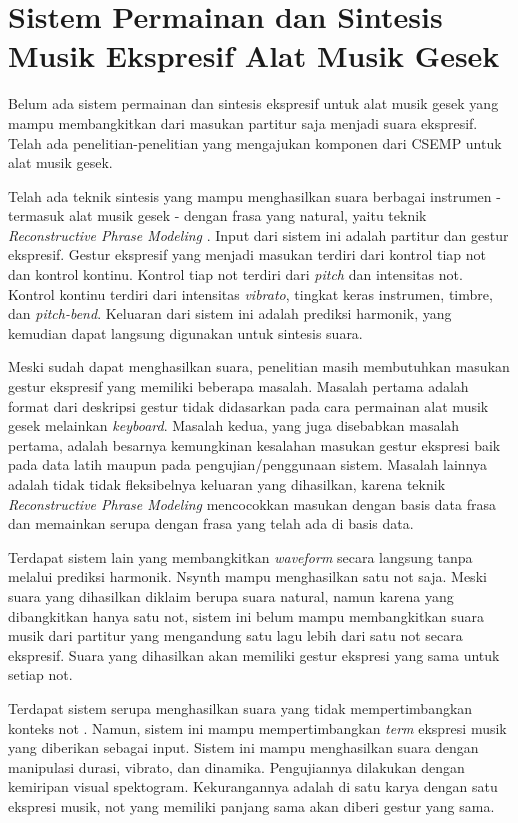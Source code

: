 \section{Sistem Permainan dan Sintesis Musik Ekspresif Alat Musik Gesek}

Belum ada sistem permainan dan sintesis ekspresif untuk alat musik gesek yang mampu membangkitkan dari masukan partitur saja menjadi suara ekspresif. Telah ada penelitian-penelitian yang mengajukan komponen dari CSEMP untuk alat musik gesek.

Telah ada teknik sintesis yang mampu menghasilkan suara berbagai instrumen - termasuk alat musik gesek - dengan frasa yang natural, yaitu teknik \textit{Reconstructive Phrase Modeling} \parencite{lindemann2007rpm}. Input dari sistem ini adalah partitur dan gestur ekspresif. Gestur ekspresif yang menjadi masukan terdiri dari kontrol tiap not dan kontrol kontinu. Kontrol tiap not terdiri dari \textit{pitch} dan intensitas not. Kontrol kontinu terdiri dari intensitas \textit{vibrato}, tingkat keras instrumen, timbre, dan \textit{pitch-bend}. Keluaran dari sistem ini adalah prediksi harmonik, yang kemudian dapat langsung digunakan untuk sintesis suara.

Meski sudah dapat menghasilkan suara, penelitian \citet{lindemann2007rpm} masih membutuhkan masukan gestur ekspresif yang memiliki beberapa  masalah. Masalah pertama adalah format dari deskripsi gestur tidak didasarkan pada cara permainan alat musik gesek melainkan \textit{keyboard}. Masalah kedua, yang juga disebabkan masalah pertama, adalah besarnya kemungkinan kesalahan masukan gestur ekspresi baik pada data latih maupun pada pengujian/penggunaan sistem. Masalah lainnya adalah tidak tidak fleksibelnya keluaran yang dihasilkan, karena teknik \textit{Reconstructive Phrase Modeling} mencocokkan masukan dengan basis data frasa dan memainkan serupa dengan frasa yang telah ada di basis data.

Terdapat sistem lain yang membangkitkan \textit{waveform} secara langsung tanpa melalui prediksi harmonik. Nsynth \parencite{nsynth2017} mampu menghasilkan satu not saja. Meski suara yang dihasilkan diklaim berupa suara natural, namun karena yang dibangkitkan hanya satu not, sistem ini belum mampu membangkitkan suara musik dari partitur yang mengandung satu lagu lebih dari satu not secara ekspresif. Suara yang dihasilkan akan memiliki gestur ekspresi yang sama untuk setiap not.

Terdapat sistem serupa menghasilkan suara yang tidak mempertimbangkan konteks not \parencite{yang2016synthesis}. Namun, sistem ini mampu mempertimbangkan \textit{term} ekspresi musik yang diberikan sebagai input. Sistem ini mampu menghasilkan suara dengan manipulasi durasi, vibrato, dan dinamika. Pengujiannya dilakukan dengan kemiripan visual spektogram. Kekurangannya adalah di satu karya dengan satu ekspresi musik, not yang memiliki panjang sama akan diberi gestur yang sama.

